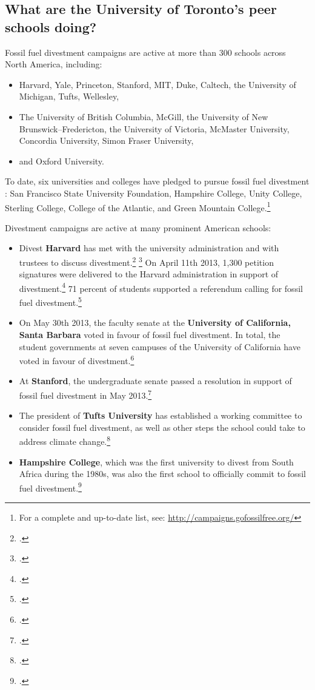 \documentclass[10pt]{article}
\begin{document}
	
	\subsection{What are the University of Toronto's peer schools doing?}
	\label{PeerSchools}



Fossil fuel divestment campaigns are active at more than 300 schools across North America, including:
\begin{itemize}
	\item Harvard, Yale, Princeton, Stanford, MIT, Duke, Caltech, the University of Michigan, Tufts, Wellesley,
	\item The University of British Columbia, McGill, the University of New Brunswick--Fredericton, the University of Victoria, McMaster University, Concordia University, Simon Fraser University,
	\item and Oxford University.
\end{itemize}
To date, six universities and colleges have pledged to pursue fossil fuel divestment : San Francisco State University Foundation, Hampshire College, Unity College, Sterling College, College of the Atlantic, and Green Mountain College.\footnote{For a complete and up-to-date list, see: \url{http://campaigns.gofossilfree.org/}}



Divestment campaigns are active at many prominent American schools:
\begin{itemize}
	\item Divest \textbf{Harvard} has met with the university administration and with trustees to discuss divestment.\footcite[][]{HarvardMeeting} \footcite[][]{HarvardTrustees} On April 11th 2013, 1,300 petition signatures were delivered to the Harvard administration in support of divestment.\footcite[][]{HarvardPetition} 71 percent of students supported a referendum calling for fossil fuel divestment.\footcite[][]{StudentsClamoring}
	\item On May 30th 2013, the faculty senate at the \textbf{University of California, Santa Barbara} voted in favour of fossil fuel divestment. In total, the student governments at seven campuses of the University of California have voted in favour of divestment.\footcite[][]{UCSB2013}
	\item At \textbf{Stanford}, the undergraduate senate passed a resolution in support of fossil fuel divestment in May 2013.\footcite[][]{StanfordSenate}
	\item The president of \textbf{Tufts University} has established a working committee to consider fossil fuel divestment, as well as other steps the school could take to address climate change.\footcite[][]{TuftsDivest}
	\item \textbf{Hampshire College}, which was the first university to divest from South Africa during the 1980s, was also the first school to officially commit to fossil fuel divestment.\footcite[][]{StudentsClamoring}
\end{itemize}
\end{document}
